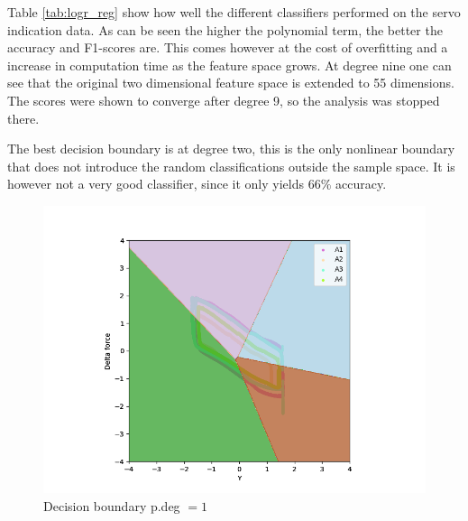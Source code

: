             Table \ref{tab:logr_reg} show how well the different classifiers performed on the servo indication data. As can be seen the higher the polynomial term, the better the accuracy and F1-scores are. This comes however at the cost of overfitting and a increase in computation time as the feature space grows. At degree nine one can see that the original two dimensional feature space is extended to 55 dimensions. The scores were shown to converge after degree 9, so the analysis was stopped there.
            
            The best decision boundary is at degree two, this is the only nonlinear boundary that does not introduce the random classifications outside the sample space. It is however not a very good classifier, since it only yields $66\%$ accuracy. 
            
            \begin{figure}[]
                \begin{minipage}[b]{0.5\linewidth}
                    \centering
                    \includegraphics[width = 1\textwidth]{figures/analysis/logistic_regression/Logistic_Regression_degree1.png}
                    \caption*{Decision boundary p.deg $= 1$}
                \end{minipage}
                \hfill
                \begin{minipage}[b]{0.5\linewidth}
                    \centering

\end{minipage}
\end{figure}
